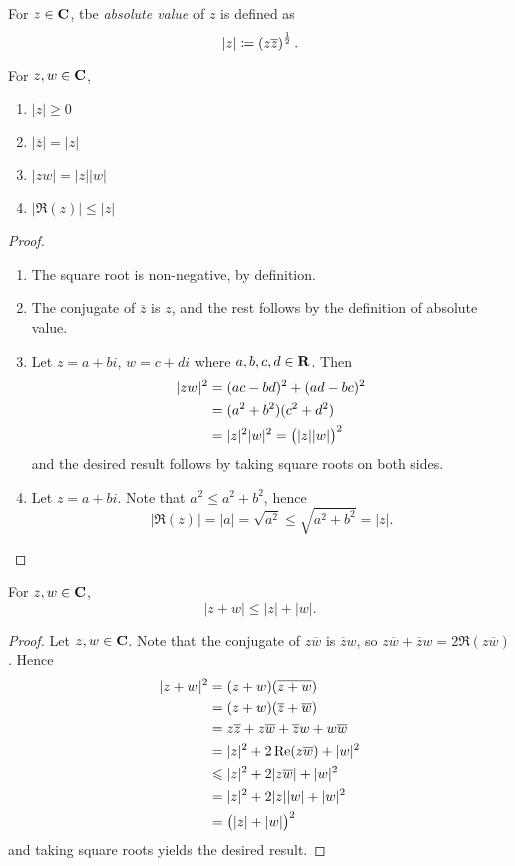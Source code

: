 \begin{definition}
For $z\in\mathbf C$, tbe \emph{absolute value} of $z$ is defined as
\[|z|\coloneqq\left(z\overline{z}\right)^\frac{1}{2}.\]
\end{definition}

\begin{proposition}
For $z,w\in\mathbf C$,
\begin{enumerate}[label=(\roman*)]
\item $|z|\ge0$
\item $|\overline{z}|=|z|$
\item $|zw|=|z||w|$
\item $|\Re(z)|\le|z|$
\end{enumerate}
\end{proposition}

\begin{proof} \
\begin{enumerate}[label=(\roman*)]
\item The square root is non-negative, by definition.
\item The conjugate of $\overline{z}$ is $z$, and the rest follows by the definition of absolute value.
\item Let $z=a+bi$, $w=c+di$ where $a,b,c,d\in\mathbf R$. Then
\begin{align*}
|zw|^2&=(ac-bd)^2+(ad-bc)^2\\
&=(a^2+b^2)(c^2+d^2)\\
&=|z|^2|w|^2=\left(|z||w|\right)^2
\end{align*}
and the desired result follows by taking square roots on both sides.
\item Let $z=a+bi$. Note that $a^2\le a^2+b^2$, hence
\[|\Re(z)|=|a|=\sqrt{a^2}\le\sqrt{a^2+b^2}=|z|.\]
\end{enumerate}
\end{proof}

\begin{theorem}
For $z,w\in\mathbf C$,
\begin{equation}
|z+w|\le|z|+|w|.
\end{equation}
\end{theorem}

\begin{proof}
Let $z,w\in\mathbf C$. Note that the conjugate of $z\overline{w}$ is $\overline{z}w$, so $z\overline{w}+\overline{z}w=2\Re(z\overline{w})$. Hence
\begin{align*}
|z+w|^2&=(z+w)(\overline{z+w})\\
&=(z+w)(\overline{z}+\overline{w})\\
&=z\overline{z}+z\overline{w}+\overline{z}w+w\overline{w}\\
&=|z|^2+2\Re(z\overline{w})+|w|^2\\
&\leqslant|z|^2+2|z\overline{w}|+|w|^2\\
&=|z|^2+2|z||w|+|w|^2\\
&=\left(|z|+|w|\right)^2
\end{align*}
and taking square roots yields the desired result.
\end{proof}

